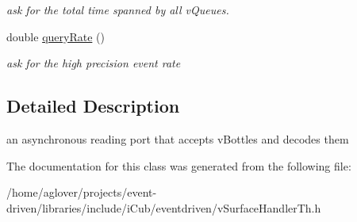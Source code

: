 \begin{DoxyCompactItemize}
\begin{DoxyCompactList}\small\item\em ask for the total time spanned by all v\+Queues. \end{DoxyCompactList}\item 
double \hyperlink{classev_1_1queueAllocator_a39005a8e9337279debe435ae26c7d6fd}{query\+Rate} ()\hypertarget{classev_1_1queueAllocator_a39005a8e9337279debe435ae26c7d6fd}{}\label{classev_1_1queueAllocator_a39005a8e9337279debe435ae26c7d6fd}

\begin{DoxyCompactList}\small\item\em ask for the high precision event rate \end{DoxyCompactList}\end{DoxyCompactItemize}


\subsection{Detailed Description}
an asynchronous reading port that accepts v\+Bottles and decodes them 

The documentation for this class was generated from the following file\+:\begin{DoxyCompactItemize}
\item 
/home/aglover/projects/event-\/driven/libraries/include/i\+Cub/eventdriven/v\+Surface\+Handler\+Th.\+h\end{DoxyCompactItemize}
